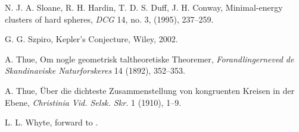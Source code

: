  N. J. A. Sloane, R. H. Hardin, T. D. S. Duff, J. H. Conway,
    Minimal-energy clusters of hard spheres,
    {\it DCG} 14,  no. 3, (1995), 237--259.

 G. G. Szpiro, Kepler's Conjecture, Wiley, 2002.

 A. Thue, Om nogle geometrisk taltheoretiske Theoremer,
    {\it Forandlingerneved de Skandinaviske Naturforskeres} 14 (1892), 352--353.

 A. Thue, \"Uber die dichteste Zusammenstellung von
    kongruenten Kreisen in der Ebene, {\it Christinia Vid. Selsk. Skr.} 1
    (1910), 1--9.

 L. L. Whyte, forward to \cite{Kep66}.
